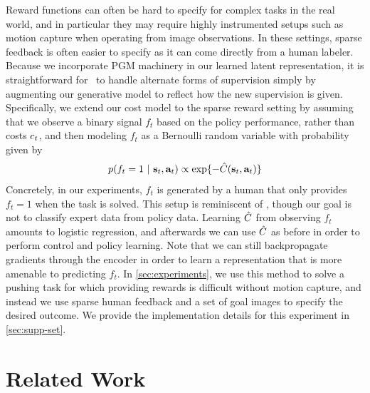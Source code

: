 Reward functions can often be hard to specify for complex tasks in the real world, and in particular they may require highly instrumented setups such as motion capture when operating from image observations. In these settings, sparse feedback is often easier to specify as it can come directly from a human labeler. Because we incorporate PGM machinery in our learned latent representation, it is straightforward for \metabbr\ to handle alternate forms of supervision simply by augmenting our generative model to reflect how the new supervision is given. Specifically, we extend our cost model to the sparse reward setting by assuming that we observe a binary signal $f_t$ based on the policy performance, rather than costs $c_t$, and then modeling $f_t$ as a Bernoulli random variable with probability given by
\[
    \p(f_t=1~|~\state_t,\action_t)\propto\exp{-\costmodel(\state_t,\action_t)}
\]
Concretely, in our experiments, $f_t$ is generated by a human that only provides $f_t=1$ when the task is solved. This setup is reminiscent of \citet{vice}, though our goal is not to classify expert data from policy data. Learning $\hat{C}$ from observing $f_t$ amounts to logistic regression, and afterwards we can use $\hat{C}$ as before in order to perform control and policy learning. Note that we can still backpropagate gradients through the encoder in order to learn a representation that is more amenable to predicting $f_t$. In \autoref{sec:experiments}, we use this method to solve a pushing task for which providing rewards is difficult without motion capture, and instead we use sparse human feedback and a set of goal images to specify the desired outcome. We provide the implementation details for this experiment in \autoref{sec:supp-set}.


\section{Related Work}
\label{sec:related}

